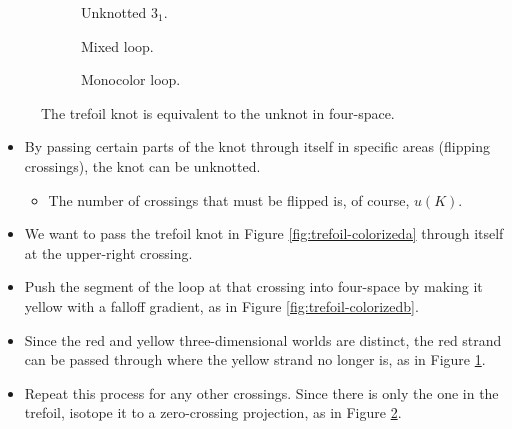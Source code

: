 \documentclass[titlepage]{article}
\numberwithin{figure}{section}
\numberwithin{table}{section}
\numberwithin{equation}{section}
\begin{document}
\begin{itemize}
\begin{figure}[h!]
\begin{subfigure}[b]{0.19\linewidth}
            \caption{Unknotted $3_1$.}
            \label{fig:trefoil-colorizedc}
        \end{subfigure}
        \begin{subfigure}[b]{0.19\linewidth}
            \centering
            \caption{Mixed loop.}
            \label{fig:trefoil-colorizedd}
        \end{subfigure}
        \begin{subfigure}[b]{0.19\linewidth}
            \centering
            \caption{Monocolor loop.}
            \label{fig:trefoil-colorizede}
        \end{subfigure}
        \caption{The trefoil knot is equivalent to the unknot in four-space.}
        \label{fig:trefoil-colorized}
    \end{figure}
    \begin{itemize}
        \item By passing certain parts of the knot through itself in specific areas (flipping crossings), the knot can be unknotted.
        \begin{itemize}
            \item The number of crossings that must be flipped is, of course, $u(K)$.
        \end{itemize}
        \item We want to pass the trefoil knot in Figure \ref{fig:trefoil-colorizeda} through itself at the upper-right crossing.
        \item Push the segment of the loop at that crossing into four-space by making it yellow with a falloff gradient, as in Figure \ref{fig:trefoil-colorizedb}.
        \item Since the red and yellow three-dimensional worlds are distinct, the red strand can be passed through where the yellow strand no longer is, as in Figure \ref{fig:trefoil-colorizedc}.
        \item Repeat this process for any other crossings. Since there is only the one in the trefoil, isotope it to a zero-crossing projection, as in Figure \ref{fig:trefoil-colorizedd}.

\end{itemize}
\end{itemize}
\end{document}
